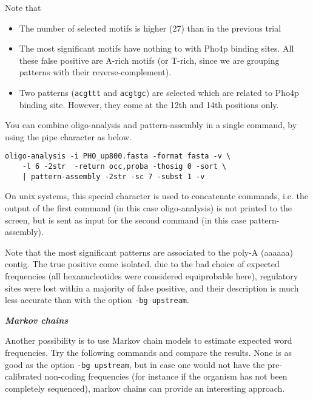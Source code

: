 Note that
\begin{itemize} 
\item The number of selected motifs is higher (27) than in the previous trial
\item The most significant motifs have nothing to with Pho4p binding
sites. All these false positive are A-rich motifs (or T-rich, since we
are grouping patterns with their reverse-complement).
\item Two patterns (\texttt{acgttt} and \texttt{acgtgc}) are selected
which are related to Pho4p binding site. However, they come at the
12th and 14th positions only.
\end{itemize}

You can combine oligo-analysis and pattern-assembly in a single
command, by using the pipe character as below.

\begin{verbatim}
oligo-analysis -i PHO_up800.fasta -format fasta -v \
    -l 6 -2str  -return occ,proba -thosig 0 -sort \
    | pattern-assembly -2str -sc 7 -subst 1 -v
\end{verbatim}

On unix systems, this special character is used to concatenate
commands, i.e. the output of the first command (in this case
oligo-analysis) is not printed to the screen, but is sent as input for
the second command (in this case pattern-assembly).

Note that the most significant patterns are associated to the poly-A
(aaaaaa) contig. The true positive come isolated. due to the bad
choice of expected frequencies (all hexanucleotides were considered
equiprobable here), regulatory sites were lost within a majority of
false positive, and their description is much less accurate than with
the option \texttt{-bg upstream}.

\textit{\textbf{Markov chains}}

Another possibility is to use Markov chain models to estimate expected
word frequencies. Try the following commands and compare the
results. None is as good as the option \texttt{-bg upstream},
but in case one would not have the pre-calibrated non-coding
frequencies (for instance if the organism has not been completely
sequenced), markov chains can provide an interesting approach.

